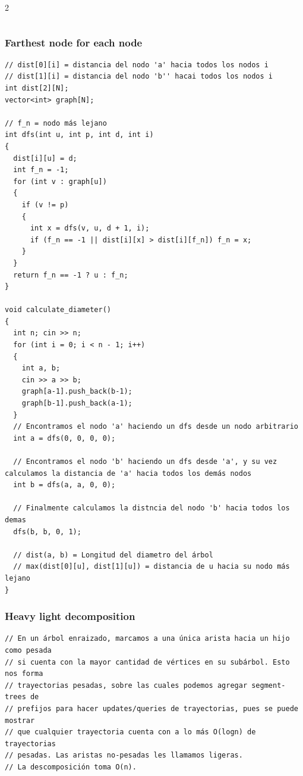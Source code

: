 \documentclass[twoside]{article}
\begin{document}
\begin{multicols*}{2}
\begin{verbatim}
\end{verbatim}

	{
		\subsubsection*{Farthest node for each node}
	}
	\begin{verbatim}
// dist[0][i] = distancia del nodo 'a' hacia todos los nodos i
// dist[1][i] = distancia del nodo 'b'' hacai todos los nodos i
int dist[2][N];
vector<int> graph[N];

// f_n = nodo más lejano
int dfs(int u, int p, int d, int i)
{
  dist[i][u] = d;
  int f_n = -1;
  for (int v : graph[u])
  {
    if (v != p)
    {
      int x = dfs(v, u, d + 1, i);
      if (f_n == -1 || dist[i][x] > dist[i][f_n]) f_n = x;
    }
  }
  return f_n == -1 ? u : f_n;
}

void calculate_diameter()
{
  int n; cin >> n;
  for (int i = 0; i < n - 1; i++)
  {
    int a, b;
    cin >> a >> b;
    graph[a-1].push_back(b-1);
    graph[b-1].push_back(a-1);
  }
  // Encontramos el nodo 'a' haciendo un dfs desde un nodo arbitrario
  int a = dfs(0, 0, 0, 0);

  // Encontramos el nodo 'b' haciendo un dfs desde 'a', y su vez calculamos la distancia de 'a' hacia todos los demás nodos
  int b = dfs(a, a, 0, 0);

  // Finalmente calculamos la distncia del nodo 'b' hacia todos los demas
  dfs(b, b, 0, 1);

  // dist(a, b) = Longitud del diametro del árbol
  // max(dist[0][u], dist[1][u]) = distancia de u hacia su nodo más lejano
}

\end{verbatim}

	{
		\subsubsection*{Heavy light decomposition}
	}
	\begin{verbatim}
// En un árbol enraizado, marcamos a una única arista hacia un hijo como pesada
// si cuenta con la mayor cantidad de vértices en su subárbol. Esto nos forma
// trayectorias pesadas, sobre las cuales podemos agregar segment-trees de
// prefijos para hacer updates/queries de trayectorias, pues se puede mostrar
// que cualquier trayectoria cuenta con a lo más O(logn) de trayectorias
// pesadas. Las aristas no-pesadas les llamamos ligeras.
// La descomposición toma O(n).


\end{verbatim}
\end{multicols*}
\end{document}

